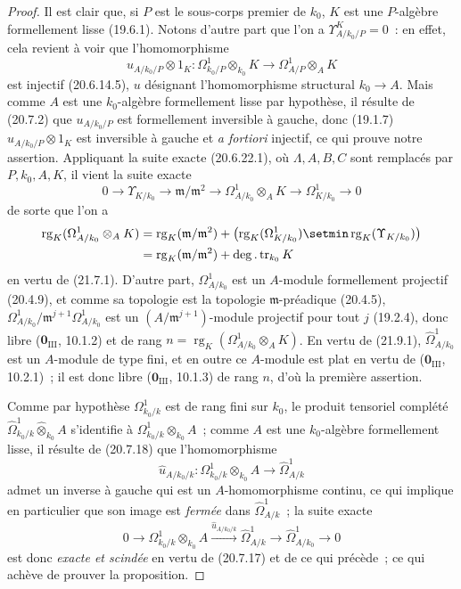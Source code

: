 \begin{proof}
Il est clair que, si $P$ est le sous-corps premier de $k_0$, $K$ est une
$P$-algèbre formellement lisse (19.6.1). Notons d'autre part que l'on a
$\Upsilon^K_{A/k_0/P}=0$~: en effet, cela revient à voir que l'homomorphisme
\[
  u_{A/k_0/P}\otimes1_K:
  \Omega^1_{k_0/P}\otimes_{k_0}K
  \longrightarrow \Omega^1_{A/P}\otimes_A K
\]
est injectif (20.6.14.5), $u$ désignant l'homomorphisme structural
$k_0\to A$. Mais comme $A$ est une $k_0$-algèbre formellement lisse par
hypothèse, il résulte de (20.7.2) que $u_{A/k_0/P}$ est formellement
inversible à gauche, donc (19.1.7) $u_{A/k_0/P}\otimes1_K$ est inversible à
gauche et \emph{a fortiori} injectif, ce qui prouve notre assertion.
Appliquant la suite exacte (20.6.22.1), où $\Lambda,A,B,C$ sont remplacés par
$P,k_0,A,K$, il vient la suite exacte
\[
  0\longrightarrow \Upsilon_{K/k_0}
  \longrightarrow \mathfrak m/\mathfrak m^2
  \longrightarrow \Omega^1_{A/k_0}\otimes_A K
  \longrightarrow \Omega^1_{K/k_0}\longrightarrow0
\]
de sorte que l'on a
\[
\begin{split}
  \operatorname{rg}_K(\Omega^1_{A/k_0}\otimes_AK)
  &={\operatorname{rg}}_K(\mathfrak m/\mathfrak m^2)
    +\bigl(\operatorname{rg}_K(\Omega^1_{K/k_0})
    \setmin\operatorname{rg}_K(\Upsilon_{K/k_0})\bigr)\\
  &={\operatorname{rg}}_K(\mathfrak m/\mathfrak m^2)
    +\deg.\operatorname{tr}_{k_0}K
\end{split}
\]
en vertu de (21.7.1). D'autre part, $\Omega^1_{A/k_0}$ est un
$A$-module formellement projectif (20.4.9), et comme sa topologie est la
topologie $\mathfrak m$-préadique (20.4.5),
$\Omega^1_{A/k_0}/\mathfrak m^{j+1}\Omega^1_{A/k_0}$ est un
$(A/\mathfrak m^{j+1})$-module projectif pour tout $j$ (19.2.4), donc libre
($\mathbf 0_{\mathrm{III}}$, 10.1.2) et de rang
$n=\operatorname{rg}_K(\Omega^1_{A/k_0}\otimes_AK)$. En vertu de (21.9.1),
$\widehat\Omega^1_{A/k_0}$ est un $A$-module de type fini, et en outre ce
$A$-module est plat en vertu de ($\mathbf 0_{\mathrm{III}}$, 10.2.1)~; il est
donc libre ($\mathbf 0_{\mathrm{III}}$, 10.1.3) de rang $n$, d'où la première
assertion.

Comme par hypothèse $\Omega^1_{k_0/k}$ est de rang fini sur $k_0$, le produit
tensoriel complété
$\widehat\Omega^1_{k_0/k}\widehat\otimes_{k_0}A$ s'identifie à
$\Omega^1_{k_0/k}\otimes_{k_0}A$~; comme $A$ est une $k_0$-algèbre
formellement lisse, il résulte de (20.7.18) que l'homomorphisme
\[
  \widehat u_{A/k_0/k}:
  \Omega^1_{k_0/k}\otimes_{k_0}A
  \longrightarrow\widehat\Omega^1_{A/k}
\]
admet un inverse à gauche qui est un $A$-homomorphisme continu, ce qui
implique en particulier que son image est \emph{fermée} dans
$\widehat\Omega^1_{A/k}$~; la suite exacte
\[
  0\longrightarrow \Omega^1_{k_0/k}\otimes_{k_0}A
  \xrightarrow{\widehat u_{A/k_0/k}}\widehat\Omega^1_{A/k}
  \longrightarrow\widehat\Omega^1_{A/k_0}\longrightarrow0
\]
est donc \emph{exacte et scindée} en vertu de (20.7.17) et de ce qui précède~; ce
qui achève de prouver la proposition.
\end{proof}

